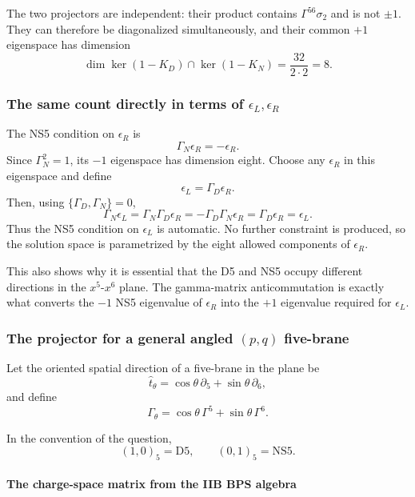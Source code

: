 \documentclass[
  10pt,
  a4paper,
  openany]{book}
\begin{document}
The two projectors are independent: their product contains
\(\Gamma^{56}\sigma_2\) and is not \(\pm1\). They can therefore be
diagonalized simultaneously, and their common \(+1\) eigenspace has
dimension \[
\dim\ker(1-K_D)\cap\ker(1-K_N)
=\frac{32}{2\cdot2}
=8.
\]

\subsubsection{\texorpdfstring{The same count directly in terms of
\(\epsilon_L,\epsilon_R\)}{The same count directly in terms of \textbackslash epsilon\_L,\textbackslash epsilon\_R}}\label{the-same-count-directly-in-terms-of-epsilon_lepsilon_r}

The NS5 condition on \(\epsilon_R\) is \[
\Gamma_N\epsilon_R=-\epsilon_R.
\] Since \(\Gamma_N^2=1\), its \(-1\) eigenspace has dimension eight.
Choose any \(\epsilon_R\) in this eigenspace and define \[
\epsilon_L=\Gamma_D\epsilon_R.
\] Then, using \(\{\Gamma_D,\Gamma_N\}=0\), \[
\Gamma_N\epsilon_L
=\Gamma_N\Gamma_D\epsilon_R
=-\Gamma_D\Gamma_N\epsilon_R
=\Gamma_D\epsilon_R
=\epsilon_L.
\] Thus the NS5 condition on \(\epsilon_L\) is automatic. No further
constraint is produced, so the solution space is parametrized by the
eight allowed components of \(\epsilon_R\).

This also shows why it is essential that the D5 and NS5 occupy different
directions in the \(x^5\)-\(x^6\) plane. The gamma-matrix
anticommutation is exactly what converts the \(-1\) NS5 eigenvalue of
\(\epsilon_R\) into the \(+1\) eigenvalue required for \(\epsilon_L\).

\subsubsection{\texorpdfstring{The projector for a general angled
\((p,q)\)
five-brane}{The projector for a general angled (p,q) five-brane}}\label{the-projector-for-a-general-angled-pq-five-brane}

Let the oriented spatial direction of a five-brane in the plane be \[
\hat t_\theta
=\cos\theta\,\partial_5+\sin\theta\,\partial_6,
\] and define \[
\Gamma_\theta
=\cos\theta\,\Gamma^5+\sin\theta\,\Gamma^6.
\]

In the convention of the question, \[
(1,0)_5=\mathrm{D5},
\qquad
(0,1)_5=\mathrm{NS5}.
\]

\paragraph{The charge-space matrix from the IIB BPS
algebra}\label{the-charge-space-matrix-from-the-iib-bps-algebra}
\end{document}
